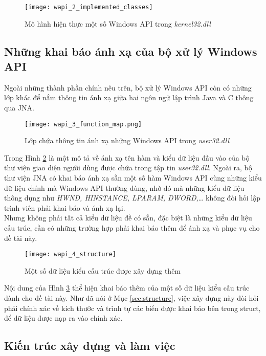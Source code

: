 	\begin{figure}[htp]
	\centering
		\texttt{[image: wapi\_2\_implemented\_classes]}
		\caption{Mô hình hiện thực một số Windows API trong \textit{kernel32.dll}}	
		\label{fig:wapi_2_implemented_classes}		
	\end{figure}

	\newpage
	\subsection{Những khai báo ánh xạ của bộ xử lý Windows API} \label{sec:mapping}

Ngoài những thành phần chính nêu trên, bộ xử lý Windows API còn có những lớp khác để nắm thông tin ánh xạ giữa hai ngôn ngữ lập trình Java và C thông qua JNA.

	\begin{figure}[H]
	\centering
		\texttt{[image: wapi\_3\_function\_map.png]}
		\caption{Lớp chứa thông tin ánh xạ những Windows API trong \textit{user32.dll}}	
		\label{fig:wapi_3_function_map}		
	\end{figure}

Trong Hình \ref{fig:wapi_3_function_map} là một mô tả về ánh xạ tên hàm và kiểu dữ liệu đầu vào của bộ thư viện giao diện người dùng được chứa trong tập tin \textit{user32.dll}. Ngoài ra, bộ thư viện JNA có khai báo ánh xạ sẵn một số hàm Windows API cùng những kiểu dữ liệu chính mà Windows API thường dùng, nhờ đó mà những kiểu dữ liệu thông dụng như \textit{HWND, HINSTANCE, LPARAM, DWORD,…} không đòi hỏi lập trình viên phải khai báo và ánh xạ lại.\\

Nhưng không phải tất cả kiểu dữ liệu đề có sẵn, đặc biệt là những kiểu dữ liệu cấu trúc, cần có những trường hợp phải khai báo thêm để ánh xạ và phục vụ cho đề tài này.

	\begin{figure}[H]
	\centering
		\texttt{[image: wapi\_4\_structure]}
		\caption{Một số dữ liệu kiểu cấu trúc được xây dựng thêm}	
		\label{fig:wapi_4_structure}		
	\end{figure}

Nội dung của Hình \ref{fig:wapi_4_structure} thể hiện khai báo thêm của một số dữ liệu kiểu cấu trúc dành cho đề tài này. Như đã nói ở Mục \ref{sec:structure}, việc xây dựng này đòi hỏi phải chính xác về kích thước và trình tự các biến được khai báo bên trong struct, để dữ liệu được nạp ra vào chính xác.

	\subsection{Kiến trúc xây dựng và làm việc}

